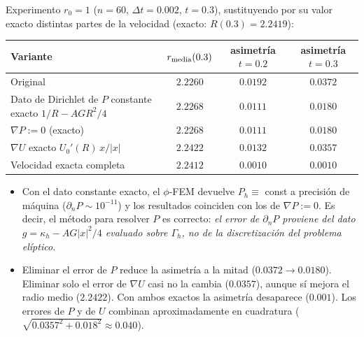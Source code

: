 Experimento $r_0=1$ ($n=60$, $\Delta t=0.002$, $t=0.3$), sustituyendo por su valor exacto distintas partes de la velocidad (exacto: $R(0.3)=2.2419$):
\begin{center}
\begin{tabular}{lccc}
\toprule
Variante & $r_{\rm media}(0.3)$ & asimetría $t=0.2$ & asimetría $t=0.3$\\
\midrule
Original & $2.2260$ & $0.0192$ & $0.0372$\\
Dato de Dirichlet de $P$ constante exacto $1/R-AGR^2/4$ & $2.2268$ & $0.0111$ & $0.0180$\\
$\nabla P:=0$ (exacto) & $2.2268$ & $0.0111$ & $0.0180$\\
$\nabla U$ exacto $U_0'(R)\,x/|x|$ & $2.2422$ & $0.0132$ & $0.0357$\\
Velocidad exacta completa & $2.2412$ & $0.0010$ & $0.0010$\\
\bottomrule
\end{tabular}
\end{center}
\begin{itemize}
	\item Con el dato constante exacto, el $\phi$-FEM devuelve $P_h\equiv$ const a precisión de máquina ($\partial_nP\sim10^{-11}$) y los resultados coinciden con los de $\nabla P:=0$. Es decir, el método para resolver $P$ es correcto: \emph{el error de $\partial_nP$ proviene del dato $g=\kappa_h-AG|x|^2/4$ evaluado sobre $\Gamma_h$, no de la discretización del problema elíptico.}
	\item Eliminar el error de $P$ reduce la asimetría a la mitad ($0.0372\to0.0180$). Eliminar solo el error de $\nabla U$ casi no la cambia ($0.0357$), aunque sí mejora el radio medio ($2.2422$). Con ambos exactos la asimetría desaparece ($0.001$). Los errores de $P$ y de $U$ combinan aproximadamente en cuadratura ($\sqrt{0.0357^2+0.018^2}\approx0.040$).
\end{itemize}

